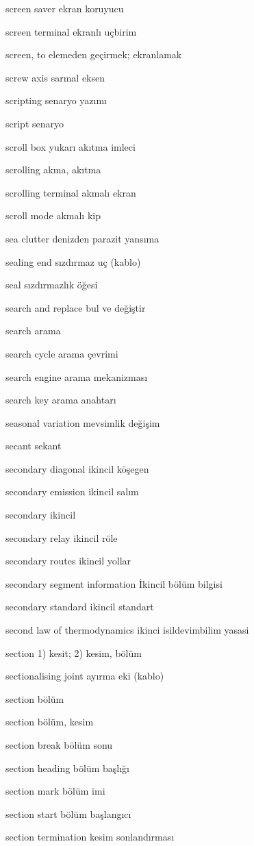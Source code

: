 \documentclass[12pt,fleqn]{article}\usepackage{../../common}
\begin{document}
screen saver ekran koruyucu

screen terminal ekranlı uçbirim

screen, to elemeden geçirmek; ekranlamak

screw axis sarmal eksen

scripting senaryo yazımı

script senaryo

scroll box yukarı akıtma imleci

scrolling akma, akıtma

scrolling terminal akmalı ekran

scroll mode akmalı kip

sea clutter denizden parazit yansıma

sealing end sızdırmaz uç (kablo)

seal sızdırmazlık öğesi

search and replace bul ve değiştir

search arama

search cycle arama çevrimi

search engine arama mekanizması

search key arama anahtarı

seasonal variation mevsimlik değişim

secant sekant

secondary diagonal ikincil köşegen

secondary emission ikincil salım

secondary ikincil

secondary relay ikincil röle

secondary routes ikincil yollar

secondary segment information İkincil bölüm bilgisi

secondary standard ikincil standart

second law of thermodynamics ikinci isildevimbilim yasasi

section 1) kesit; 2) kesim, bölüm

sectionalising joint ayırma eki (kablo)

section bölüm

section bölüm, kesim

section break bölüm sonu

section heading bölüm başlığı

section mark bölüm imi

section start bölüm başlangıcı

section termination kesim sonlandırması
\end{document}
